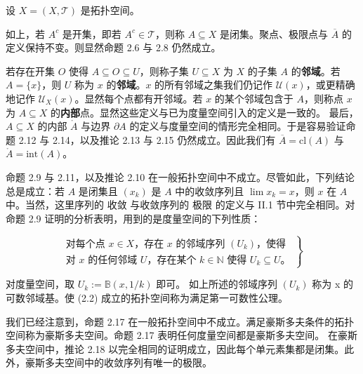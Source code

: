 \begin{remark}

设 $ X = (X, \mathcal{T}) $ 是拓扑空间。

\begin{items}
\item

如上，若 $ A^c $ 是开集，即若 $ A^c \in \mathcal{T} $，则称 $ A \subseteq X $ 是闭集。聚点、极限点与 $ \overline{A} $ 的定义保持不变。则显然命题 2.6 与 2.8 仍然成立。

\item

若存在开集 $O$ 使得 $A \subseteq O \subseteq U$，则称子集 $U \subseteq X$ 为 $X$ 的子集 $A$ 的\textbf{邻域}。若 $A = \{x\}$，则 $U$ 称为 $x$ 的\textbf{邻域}。$x$ 的所有邻域之集我们仍记作 $\mathcal{U}(x)$，或更精确地记作 $\mathcal{U}_X(x)$。显然每个点都有开邻域。若 $x$ 的某个邻域包含于 $A$，则称点 $x$ 为 $A \subseteq X$ 的\textbf{内部}点。显然这些定义与已为度量空间引入的定义是一致的。
最后，$ A \subseteq X $ 的内部 $ \mathring{A} $ 与边界 $ \partial A $ 的定义与度量空间的情形完全相同。于是容易验证命题 2.12 与 2.14，以及推论 2.13 与 2.15 仍然成立。因此我们有 $ \overline{A} = \mathrm{cl}(A) $ 与 $ \mathring{A} = \mathrm{int}(A) $。

\item

命题 2.9 与 2.11，以及推论 2.10 在一般拓扑空间中不成立。尽管如此，下列结论总是成立：若 $A$ 是闭集且 $(x_k)$ 是 $A$ 中的收敛序列且 $\lim x_k = x$，则 $x$ 在 $A$ 中。当然，这里序列的 $\text{收敛}$ 与收敛序列的 $\text{极限}$ 的定义与 II.1 节中完全相同。对命题 2.9 证明的分析表明，用到的是度量空间的下列性质：

\begin{equation}
\left.\begin{gathered} \text{对每个点 } x \in X \text{，存在 } x \text{ 的邻域序列 } (U_k) \text{，使得} \\ \text{对 } x \text{ 的任何邻域 } U \text{，存在某个 } k \in \mathbb{N} \text{ 使得 } U_k \subseteq U\text{。} \end{gathered}\right\}
\end{equation}

对度量空间，取 $ U_k := \mathbb{B}(x, 1/k) $ 即可。
如上所述的邻域序列 $ (U_{k}) $ 称为 x 的可数邻域基。使 (2.2) 成立的拓扑空间称为满足第一可数性公理。

\item

我们已经注意到，命题 2.17 在一般拓扑空间中不成立。满足豪斯多夫条件的拓扑空间称为豪斯多夫空间。命题 2.17 表明任何度量空间都是豪斯多夫空间。
在豪斯多夫空间中，推论 2.18 以完全相同的证明成立，因此每个单元素集都是闭集。此外，豪斯多夫空间中的收敛序列有唯一的极限。


\end{items}
\end{remark}
